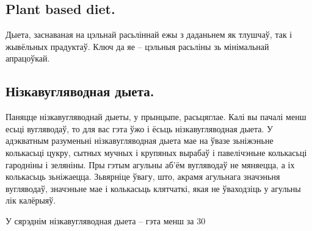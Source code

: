 \subsection{Plant based diet.}
Дыета, заснаваная на цэльнай расьліннай ежы з даданьнем як тлушчаў, так і жывёльных прадуктаў. Ключ да яе – цэльныя расьліны зь мінімальнай апрацоўкай.

\subsection{Нізкавугляводная дыета.}
Паняцце нізкавугляводнай дыеты, у прынцыпе, расьцяглае. Калі вы пачалі менш есьці вугляводаў, то для вас гэта ўжо і ёсьць нізкавугляводная дыета. У адэкватным разуменьні нізкавугляводная дыета мае на ўвазе зьніжэньне колькасьці цукру, сытных мучных і крупяных вырабаў і павелічэньне колькасьці гародніны і зеляніны. Пры гэтым агульны аб'ём вугляводаў не мяняецца, а іх колькасьць зьніжаецца. Зьвярніце ўвагу, што, акрамя агульнага значэньня вугляводаў, значэньне мае і колькасьць клятчаткі, якая не ўваходзіць у агульны лік калёрыяў.

У сярэднім нізкавугляводная дыета – гэта менш за 30%
